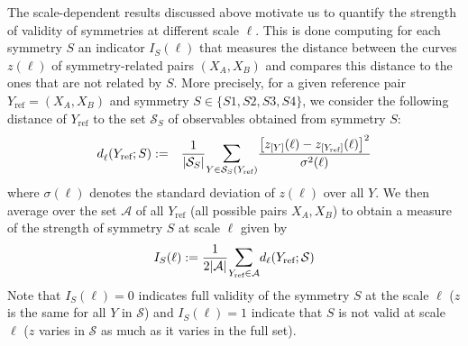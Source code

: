 \documentclass[fleqn,10pt]{wlscirep}
\begin{document}
%
The scale-dependent results discussed above motivate us to quantify the strength of validity of symmetries at different scale $\ell$.  This is done computing for each symmetry $S$ an indicator $I_{S}(\ell)$ that measures the distance between the curves $z(\ell)$ of symmetry-related pairs $(X_A,X_B)$ and compares this distance to the ones that are not related by $S$.  
%
More precisely, for a given  reference pair $Y_{\textrm{ref}}=(X_A,X_B)$ and  symmetry $S\in \{S1,S2,S3,S4\}$,  we consider the  following distance of $Y_{\textrm{ref}}$ to the set $\mathcal{S}_S$ of observables obtained from symmetry $S$:   
\begin{eqnarray}
d_{\ell}^{}(Y_{\textrm{ref}}; S )&:=&\frac1{ |\mathcal{S}_S|} \mathlarger{\sum}_{Y \in \mathcal{S}_S(Y_{\textrm{ref}})}{ \frac{ \left[ z_{[Y]}{(\ell)} - z_{[Y_{\textrm{ref}}]}(\ell)\right]^2 }{\sigma^2(\ell)}} 
\end{eqnarray}
where $\sigma(\ell)$ denotes the standard deviation of $z(\ell)$ over all $Y$. 
We  then average over the set $\mathcal{A}$ of all $Y_{\textrm{ref}}$ (all possible pairs $X_A,X_B$) to obtain a measure of the strength of symmetry $S$ at scale $\ell$ given by 
\begin{equation}
I_{S}(\ell):=\frac1{2|\mathcal{A}|} \mathlarger{\sum}_{Y_{\textrm{ref}}\in \mathcal{A} }{ d_{\ell}(Y_{\textrm{ref}}; \mathcal{S} )}
\end{equation}
%
%
Note that  $I_{S}(\ell)=0$ indicates full validity of the symmetry $S$ at the scale $\ell$ ($z$ is the same for all $Y$ in $\mathcal{S}$) and $I_{S}(\ell)=1$ indicate that $S$ is not valid at scale $\ell$ ($z$ varies in $\mathcal{S}$ as much as it varies in the full set).



\end{document}
